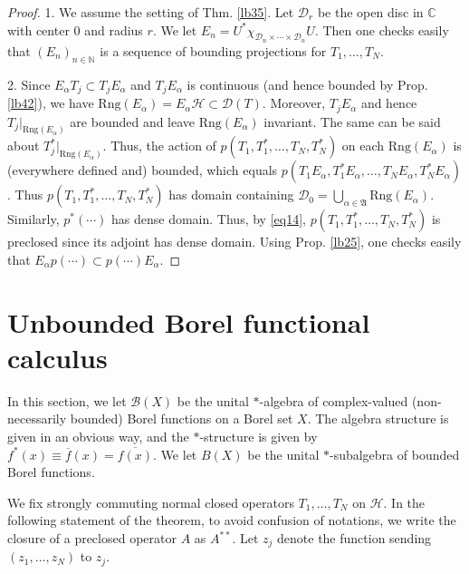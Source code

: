 \documentclass[12pt,a4paper,notitlepage]{article}
\theoremstyle{definition}
\theoremstyle{plain}
\newcommand{\fk}{\mathfrak}
\newcommand{\mc}{\mathcal}
\newcommand{\ovl}{\overline}
\newcommand{\Dom}{\scr D}
\newcommand{\scr}{\mathscr}
\newcommand{\Cbb}{\mathbb C}
\newcommand{\Nbb}{\mathbb N}
\newcommand{\Rng}{\mathrm{Rng}}
\numberwithin{equation}{section}
\begin{document}
\begin{proof}
1. We assume the setting of Thm. \ref{lb35}. Let $\mc D_r$ be the open disc in $\Cbb$ with center $0$ and radius $r$. We let $E_n=U^*\chi_{\mc D_n\times\cdots\times \mc D_n}U$. Then one checks easily that $(E_n)_{n\in\Nbb}$ is a sequence of bounding projections for $T_1,\dots,T_N$.
	
2. Since $E_\alpha T_j\subset T_jE_\alpha$ and $T_jE_\alpha$ is continuous (and hence bounded by Prop. \ref{lb42}), we have $\Rng(E_\alpha)=E_\alpha\mc H\subset \Dom(T)$. Moreover, $T_jE_\alpha$ and hence $T_j|_{\Rng(E_\alpha)}$ are bounded and leave $\Rng(E_\alpha)$ invariant. The same can be said about $T_j^*|_{\Rng(E_\alpha)}$. Thus, the action of $p(T_1,T_1^*,\dots,T_N,T_N^*)$  on each $\Rng(E_\alpha)$  is (everywhere defined and) bounded, which equals $p(T_1E_\alpha,T_1^*E_\alpha,\dots,T_NE_\alpha,T_N^*E_\alpha)$. Thus $p(T_1,T_1^*,\dots,T_N,T_N^*)$ has domain containing $\Dom_0=\bigcup_{\alpha\in\fk A}\Rng(E_\alpha)$. Similarly, $p^*(\cdots)$ has dense domain. Thus, by \eqref{eq14}, $p(T_1,T_1^*,\dots,T_N,T_N^*)$ is preclosed since its adjoint has dense domain. Using Prop. \ref{lb25}, one checks easily that $E_\alpha p(\cdots)\subset p(\cdots)E_\alpha$. 
\end{proof}


\section{Unbounded Borel functional calculus}


In this section, we let $\scr B(X)$ \index{BX@$\scr B(X),B(X)$} be the unital $*$-algebra of complex-valued (non-necessarily bounded) Borel functions on a Borel set $X$. The algebra structure is given in an obvious way, and the $*$-structure is given by $f^*(x)\equiv\ovl f(x)=\ovl{f(x)}$. We let $B(X)$ be the unital $*$-subalgebra of bounded Borel functions.




We fix strongly commuting normal closed operators $T_1,\dots,T_N$ on $\mc H$. In the following statement of the theorem, to avoid confusion of notations, we write the closure of a preclosed operator $A$ as $A^{**}$. Let $z_j$ denote the function sending $(z_1,\dots,z_N)$ to $z_j$.
\end{document}

